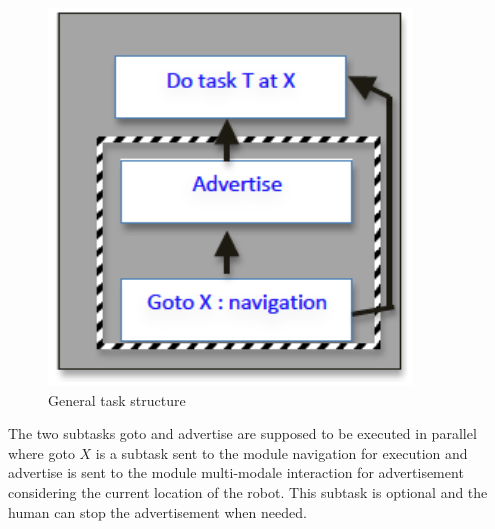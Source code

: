 \documentclass{article}
\begin{document}
\begin{figure}[htbp]
\begin{center}
\includegraphics[height=10cm]{GeneralTask}
\caption{General task structure }
\label{FigTaskstructure}
\end{center}
\end{figure}

The two subtasks goto and advertise are supposed to be executed in parallel where goto $X$ is a subtask sent to the module navigation for execution and advertise is sent to the module multi-modale interaction for advertisement considering the current location of the robot. This subtask is optional and the human can stop the advertisement when needed. 
\end{document}
